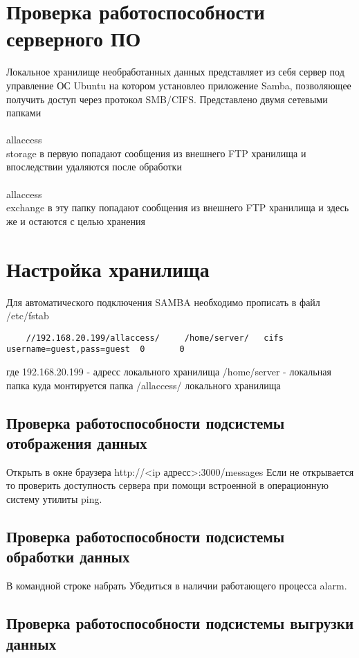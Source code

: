 \documentclass[12pt]{article}[a4paper,14pt,russian]
\begin{document}
	\section{Проверка работоспособности серверного ПО}
	Локальное хранилище необработанных данных представляет из себя сервер под управление ОС Ubuntu на котором установлео приложение Samba, позволяющее  получить доступ через протокол SMB/CIFS. Представлено двумя сетевыми папками
	\\<ip адрес сервера>\\allaccess\\storage
	в первую попадают сообщения из внешнего FTP хранилища и впоследствии удаляются после обработки
	\\<ip адрес сервера>\\allaccess\\exchange
	в эту папку попадают сообщения из внешнего FTP хранилища и здесь же и остаются
	с целью хранения
	\section{Настройка хранилища}
	Для автоматического подключения SAMBA необходимо прописать в файл
	/etc/fstab
	\begin{verbatim}
	//192.168.20.199/allaccess/     /home/server/   cifs username=guest,pass=guest  0       0
	\end{verbatim}
	где 192.168.20.199 - адресс локального хранилища
	/home/server - локальная папка куда монтируется папка /allaccess/ локального хранилища
	\subsection{Проверка работоспособности подсистемы отображения данных}
	Открыть в окне браузера http://<ip адресс>:3000/messages
	Если не открывается то проверить доступность сервера при
	помощи встроенной в операционную систему утилиты ping.
	
    \subsection{Проверка работоспособности подсистемы обработки данных}
    В командной строке набрать 
    Убедиться в наличии работающего процесса alarm.
    \subsection{Проверка работоспособности подсистемы выгрузки данных}
\end{document}
